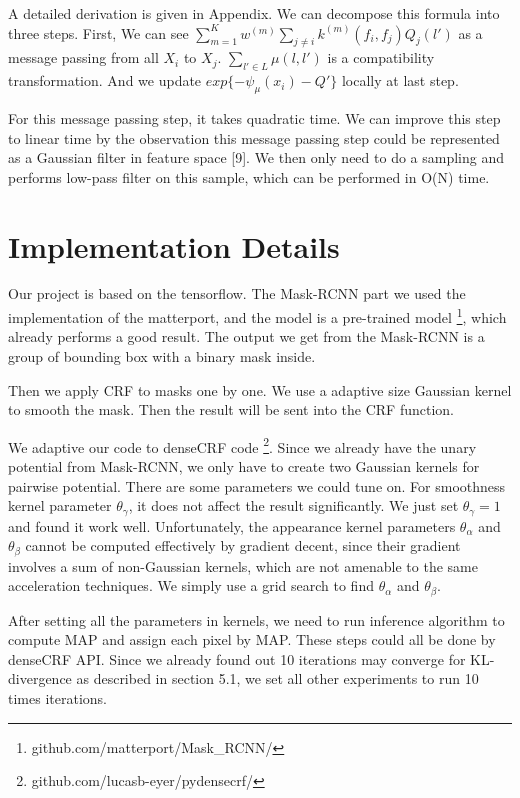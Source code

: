 \documentclass{article}
\begin{document}
A detailed derivation is given in Appendix. We can decompose this formula into three steps. First, We can see $\sum\limits_{m=1}^K w^{(m)}\sum_{j\neq i}k^{(m)}(f_{i},f_{j})Q_{j}(l')$ as a message passing from all $X_{i}$ to $X_{j}$. $\sum_{l'\in L}\mu(l,l')$ is a compatibility transformation. And we update $exp\{-\psi_{\mu}(x_{i})-Q'\}$ locally at last step. 

For this message passing step, it takes quadratic time. We can improve this step to linear time by the observation this message passing step could be represented as a Gaussian filter in feature space [9]. We then only need to do a sampling and performs low-pass filter on this sample, which can be performed in O(N) time.

\section{Implementation Details}

Our project is based on the tensorflow. The Mask-RCNN part we used the implementation of the matterport, and the model is a pre-trained model \footnote{github.com/matterport/Mask\_RCNN/}, which already performs a good result. The output we get from the Mask-RCNN is a group of bounding box with a binary mask inside.

Then we apply CRF to masks one by one. We use a adaptive size Gaussian kernel to smooth the mask. Then the result will be sent into the CRF function. 

We adaptive our code to denseCRF code \footnote{github.com/lucasb-eyer/pydensecrf/}. Since we already have the unary potential from Mask-RCNN, we only have to create two Gaussian kernels for pairwise potential. There are some parameters we could tune on. For smoothness kernel parameter $\theta_{\gamma}$, it does not affect the result significantly. We just set $\theta_{\gamma}=1$ and found it work well. Unfortunately, the appearance kernel parameters $\theta_{\alpha}$ and $\theta_{\beta}$ cannot be computed effectively by gradient decent, since their gradient involves a sum of non-Gaussian kernels, which are not amenable to the same acceleration techniques. We simply use a grid search to find $\theta_{\alpha}$ and $\theta_{\beta}$.

After setting all the parameters in kernels, we need to run inference algorithm to compute MAP and assign each pixel by MAP. These steps could all be done by denseCRF API. Since we already found out 10 iterations may converge for KL-divergence as described in section 5.1, we set all other experiments to run 10 times iterations.
\end{document}
